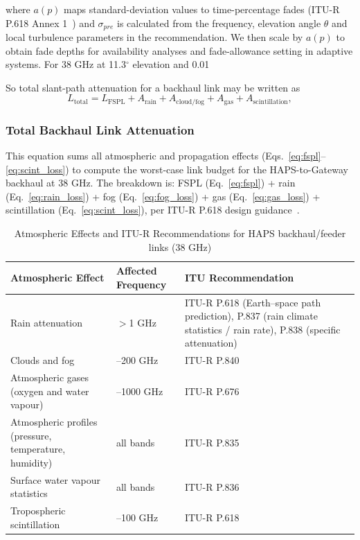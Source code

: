 \documentclass[conference]{IEEEtran}
\begin{document}
where $a(p)$ maps standard-deviation values to time-percentage fades (ITU-R P.618 Annex 1~\cite{itu_p618})
and $\sigma_{pre}$ is calculated from the frequency, elevation angle $\theta$ and
local turbulence parameters in the recommendation. We then scale by $a(p)$ to obtain fade depths
for availability analyses and fade-allowance setting in adaptive systems. For 38 GHz at 11.3$^\circ$ elevation
and 0.01%

So total slant-path attenuation for a backhaul link may be written as
\begin{equation}
L_\mathrm{total} = L_\mathrm{FSPL} + A_\mathrm{rain} + A_\mathrm{cloud/fog}
                  + A_\mathrm{gas} + A_\mathrm{scintillation},
\label{eq:feeder_loss}
\end{equation}

\subsubsection{Total Backhaul Link Attenuation~\cite{itu_p618}}
This equation sums all atmospheric and propagation effects (Eqs.~\eqref{eq:fspl}--\eqref{eq:scint_loss}) to compute the worst-case link budget for the HAPS-to-Gateway backhaul at 38 GHz. The breakdown is: FSPL (Eq.~\eqref{eq:fspl}) + rain (Eq.~\eqref{eq:rain_loss}) + fog (Eq.~\eqref{eq:fog_loss}) + gas (Eq.~\eqref{eq:gas_loss}) + scintillation (Eq.~\eqref{eq:scint_loss}), per ITU-R P.618 design guidance~\cite{itu_p618}.

\begin{table}[t]
\centering
\caption{Atmospheric Effects and ITU-R Recommendations for HAPS backhaul/feeder links (38 GHz)}
\label{tab:atmospheric_effects}
{\scriptsize\setlength{\tabcolsep}{3pt}
\begin{tabularx}{\columnwidth}{|>{\raggedright\arraybackslash}p{}|>{\raggedright\arraybackslash}p{}|>{\raggedright\arraybackslash}X|}
\hline
\textbf{Atmospheric Effect} & \textbf{Affected Frequency} & \textbf{ITU Recommendation}  \\
\hline
Rain attenuation & $>$1 GHz & ITU-R P.618 (Earth–space path prediction), P.837 (rain climate statistics / rain rate), P.838 (specific attenuation)\\
\hline
Clouds and fog & 1--200 GHz & ITU-R P.840\\
\hline
Atmospheric gases (oxygen and water vapour) & 1--1000 GHz & ITU-R P.676\\
\hline
Atmospheric profiles (pressure, temperature, humidity) & all bands & ITU-R P.835\\
\hline
Surface water vapour statistics & all bands & ITU-R P.836\\
\hline
Tropospheric scintillation & 1--100 GHz & ITU-R P.618\\
\hline
\end{tabularx}}
\end{table}
\end{document}
